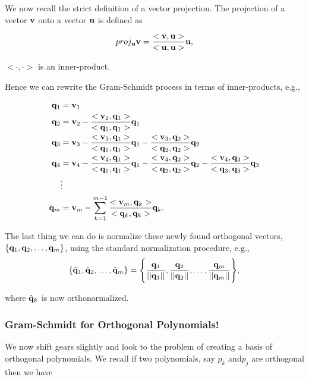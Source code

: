 We now recall the strict definition of a vector projection. The projection of a vector ${\bf{v}}$ onto a vector ${\bf{u}}$ is defined as

 $$proj_{{\bf{u}}} {\bf{v}}= \frac{< {\bf{v}} , {\bf{u}}> }{ < {\bf{u}} , {\bf{u}} >  } {\bf{u}}, $$ 

$<\cdot, \cdot>$ is an inner-product.

Hence we can rewrite the Gram-Schmidt process in terms  of inner-products, e.g.,

\begin{align*}
{\bf{q}}_1 &= {\bf{v}}_1 \\ 
{\bf{q}}_2 &= {\bf{v}}_2 -  \frac{< {\bf{v}}_2 , {\bf{q}}_1 > }{ < {\bf{q}}_1 , {\bf{q}}_1 >  } {\bf{q}}_1 \\
{\bf{q}}_3 &= {\bf{v}}_3 - \frac{< {\bf{v}}_3 , {\bf{q}}_1 > }{ < {\bf{q}}_1 , {\bf{q}}_1 >  } {\bf{q}}_1  - \frac{< {\bf{v}}_3 , {\bf{q}}_2 > }{ < {\bf{q}}_2 , {\bf{q}}_2 >  } {\bf{q}}_2\\ 
{\bf{q}}_4 &= {\bf{v}}_4 - \frac{< {\bf{v}}_4 , {\bf{q}}_1 > }{ < {\bf{q}}_1 , {\bf{q}}_1 >  } {\bf{q}}_1  -  \frac{< {\bf{v}}_4 , {\bf{q}}_2 > }{ < {\bf{q}}_2 , {\bf{q}}_2>  } {\bf{q}}_2 - \frac{< {\bf{v}}_4 , {\bf{q}}_3 > }{ < {\bf{q}}_3 , {\bf{q}}_3 >  } {\bf{q}}_3 \\ 
& \vdots  \\ 
{\bf{q}}_m &=  {\bf{v}}_m - \sum_{k=1}^{m-1}  \frac{< {\bf{v}}_m , {\bf{q}}_k > }{ < {\bf{q}}_k , {\bf{q}}_k >  } {\bf{q}}_k.
\end{align*}

The last thing we can do is normalize these newly found orthogonal vectors, $\{ {\bf{q}}_1, {\bf{q}}_2, \ldots, {\bf{q}}_m \}$, using the standard normalization procedure, e.g., 
$$\{ \hat{{\bf{q}}}_1, \hat{{\bf{q}}}_2, \ldots, \hat{{\bf{q}}}_m \} = \Bigg\{ \frac{ {\bf{q}}_1 }{|| {\bf{q}}_1 || },  \frac{ {\bf{q}}_2 }{|| {\bf{q}}_2 || }, \ldots,  \frac{ {\bf{q}}_m }{|| {\bf{q}}_m || } \Bigg\},$$

where $\hat{ {\bf{q}}}_k$ is now orthonormalized.  


%
%
%
%
\subsubsection{Gram-Schmidt for Orthogonal Polynomials!}

We now shift gears slightly and look to the problem of creating a basis of orthogonal polynomials. We recall if two polynomials, say $p_k$ and$p_j$ are orthogonal then we have 

